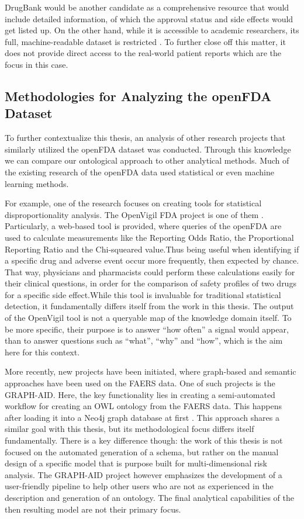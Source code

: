 DrugBank would be another candidate as a comprehensive resource that would include detailed information, of which the approval status and side effects would get listed up. On the other hand, while it is accessible to academic researchers, its full, machine-readable dataset is restricted \cite{DrugBankWebsite}. To further close off this matter, it does not provide direct access to the real-world patient reports which are the focus in this case. 
\subsection{Methodologies for Analyzing the openFDA Dataset }
To further contextualize this thesis, an analysis of other research projects that similarly utilized the openFDA dataset was conducted. Through this knowledge we can compare our ontological approach to other analytical methods. Much of the existing research of the openFDA data used statistical or even machine learning methods. 

For example, one of the research focuses on creating tools for statistical disproportionality analysis. The OpenVigil FDA project is one of them \cite{Bohm2016openvigil}. Particularly, a  web-based tool is provided, where queries of the openFDA are used to calculate measurements like the Reporting Odds Ratio, the Proportional Reporting Ratio and the Chi-squeared value.Thus being useful when identifying if a specific drug and adverse event occur more frequently, then expected by chance. That way, physicians and pharmacists could perform these calculations easily for their clinical questions, in order for the comparison of safety profiles of two drugs for a specific side effect.While this tool is invaluable for traditional statistical detection, it fundamentally differs itself from the work in this thesis. The output of the OpenVigil tool is not a queryable map of the knowledge domain itself. To be more specific, their purpose is to answer “how often” a signal would appear, than to answer questions such as “what”, “why” and “how”, which is the aim here for this context. 

More recently, new projects have been initiated, where graph-based and semantic approaches have been used on the FAERS data. One of such projects is the GRAPH-AID. Here, the key functionality lies in creating a semi-automated workflow for creating an OWL ontology from the FAERS data. This happens after loading it into a Neo4j graph database at first \cite{li2024neuralcorrelateslogicalmathematicalsymbol}. This approach shares a similar goal with this thesis, but its methodological focus differs itself fundamentally. There is a key difference though: the work of this thesis is not focused on the automated generation of a schema, but rather on the manual design of a specific model that is purpose built for multi-dimensional risk analysis. The GRAPH-AID project however emphasizes the development of a user-friendly pipeline to help other users who are not as experienced in the description and generation of an ontology. The final analytical capabilities of the then resulting model are not their primary focus. 
